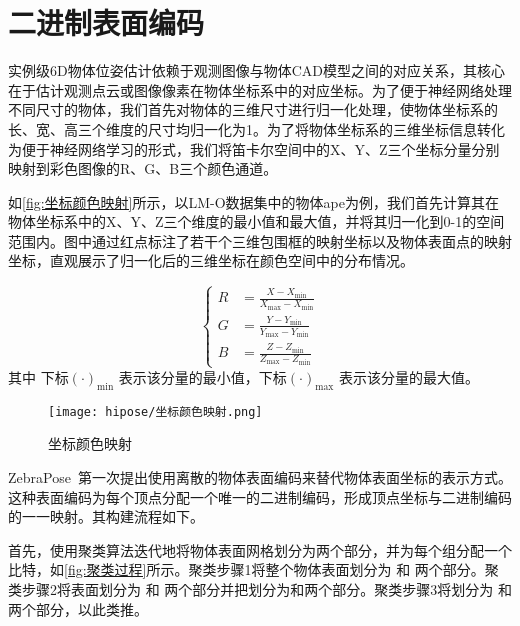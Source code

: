 \section{二进制表面编码}
\label{sec:hipose_encoding}

\par 实例级6D物体位姿估计依赖于观测图像与物体CAD模型之间的对应关系，其核心在于估计观测点云或图像像素在物体坐标系中的对应坐标。为了便于神经网络处理不同尺寸的物体，我们首先对物体的三维尺寸进行归一化处理，使物体坐标系的长、宽、高三个维度的尺寸均归一化为1。为了将物体坐标系的三维坐标信息转化为便于神经网络学习的形式，我们将笛卡尔空间中的X、Y、Z三个坐标分量分别映射到彩色图像的R、G、B三个颜色通道。

\par 如\autoref{fig:坐标颜色映射}所示，以LM-O数据集中的物体ape为例，我们首先计算其在物体坐标系中的X、Y、Z三个维度的最小值和最大值，并将其归一化到0-1的空间范围内。图中通过红点标注了若干个三维包围框的映射坐标以及物体表面点的映射坐标，直观展示了归一化后的三维坐标在颜色空间中的分布情况。

\begin{equation}
    \left\{
    \begin{aligned}
        R &= \frac{X - X_{\min}}{X_{\max} - X_{\min}} \\
        G &= \frac{Y - Y_{\min}}{Y_{\max} - Y_{\min}} \\
        B &= \frac{Z - Z_{\min}}{Z_{\max} - Z_{\min}}
    \end{aligned}
    \right.
\end{equation}
其中 下标$(\cdot)_{\min}$ 表示该分量的最小值，下标$(\cdot)_{\max}$ 表示该分量的最大值。

\begin{figure}[ht]
    \centering
    \texttt{[image: hipose/坐标颜色映射.png]}
    \caption{坐标颜色映射}
    \label{fig:坐标颜色映射}
\end{figure}

ZebraPose~\cite{su2022zebrapose}第一次提出使用离散的物体表面编码来替代物体表面坐标的表示方式。这种表面编码为每个顶点分配一个唯一的二进制编码，形成顶点坐标与二进制编码的一一映射。其构建流程如下。

首先，使用聚类算法迭代地将物体表面网格划分为两个部分，并为每个组分配一个比特，如\autoref{fig:聚类过程}所示。聚类步骤1将整个物体表面划分为  和 两个部分。聚类步骤2将表面划分为 和 两个部分并把划分为和两个部分。聚类步骤3将划分为  和 两个部分，以此类推。

